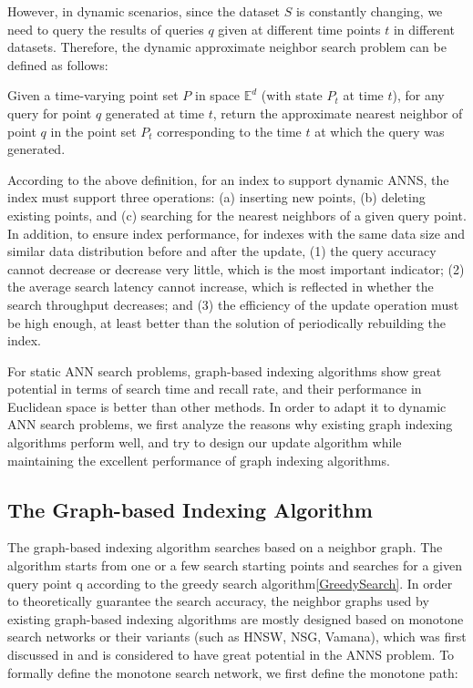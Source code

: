 However, in dynamic scenarios, since the dataset $S$ is constantly changing, we need to query the results of queries $q$ given at different time points $t$ in different datasets. Therefore, the dynamic approximate neighbor search problem can be defined as follows:

\begin{definition}\label{real_anns}
	Given a time-varying point set $P$ in space $\mathbb{E}^d$ (with state $P_t$ at time $t$), for any query for point $q$ generated at time $t$, return the approximate nearest neighbor of point $q$ in the point set $P_t$ corresponding to the time $t$ at which the query was generated.
\end{definition}

According to the above definition, for an index to support dynamic ANNS, the index must support three operations: (a) inserting new points, (b) deleting existing points, and (c) searching for the nearest neighbors of a given query point. In addition, to ensure index performance, for indexes with the same data size and similar data distribution before and after the update, (1) the query accuracy cannot decrease or decrease very little, which is the most important indicator; (2) the average search latency cannot increase, which is reflected in whether the search throughput decreases; and (3) the efficiency of the update operation must be high enough, at least better than the solution of periodically rebuilding the index.

For static ANN search problems, graph-based indexing algorithms show great potential in terms of search time and recall rate, and their performance in Euclidean space is better than other methods\cite{DBLP:journals/pvldb/FuXWC19}. In order to adapt it to dynamic ANN search problems, we first analyze the reasons why existing graph indexing algorithms perform well, and try to design our update algorithm while maintaining the excellent performance of graph indexing algorithms.

\subsection{The Graph-based Indexing Algorithm}
The graph-based indexing algorithm searches based on a neighbor graph. The algorithm starts from one or a few search starting points and searches for a given query point q according to the greedy search algorithm\ref{GreedySearch}. In order to theoretically guarantee the search accuracy, the neighbor graphs used by existing graph-based indexing algorithms are mostly designed based on monotone search networks or their variants (such as HNSW\cite{DBLP:journals/corr/MalkovY16}, NSG\cite{DBLP:journals/pvldb/FuXWC19}, Vamana\cite{DBLP:journals/corr/abs-2105-09613}), which was first discussed in \cite{DBLP:conf/soda/AryaM93} and is considered to have great potential in the ANNS problem. To formally define the monotone search network, we first define the monotone path:

